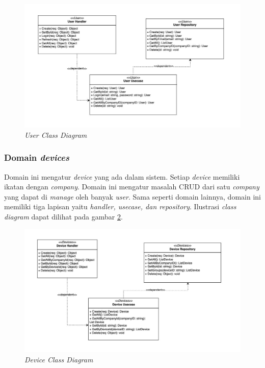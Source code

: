 \begin{figure}[ht]
  \centering
  \includegraphics[width=1\textwidth]{resources/chapter-3/class/user-class-diagram.jpg}
  \caption{\textit{User Class Diagram}}
  \label{fig:user-class-diagram}
\end{figure}

\subsubsection{Domain \textit{devices}}

Domain ini mengatur \textit{device} yang ada dalam sistem. Setiap \textit{device} memiliki ikatan dengan \textit{company}. Domain ini mengatur masalah CRUD dari satu \textit{company} yang dapat di \textit{manage} oleh banyak \textit{user}. Sama seperti domain lainnya, domain ini memiliki tiga lapisan yaitu \textit{handler, usecase, dan repository}. Ilustrasi \textit{class diagram} dapat dilihat pada gambar \ref{fig:device-class-diagram}.

\begin{figure}[ht]
  \centering
  \includegraphics[width=1\textwidth]{resources/chapter-3/class/device-class-diagram.jpg}
  \caption{\textit{Device Class Diagram}}
  \label{fig:device-class-diagram}
\end{figure}


